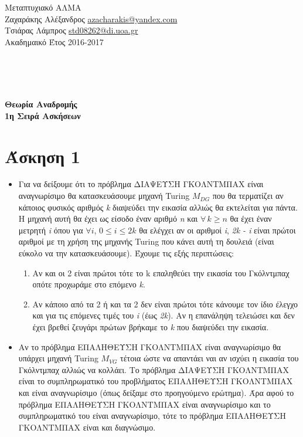\documentclass[11pt]{article}
\begin{document}
\noindent\begin{minipage}{\textwidth}

  \begin{minipage}[b]{.6\textwidth}
    \large{
      Μεταπτυχιακό ΑΛΜΑ\\
      Ζαχαράκης Αλέξανδρος \href{mailto:azacharakis@yandex.com}{azacharakis@yandex.com}\\
      Τσιάρας Λάμπρος \href{mailto:std08262@di.uoa.gr}{std08262@di.uoa.gr} \\
      Ακαδημαικό Έτος 2016-2017
    }
    \\
  \end{minipage}

\end{minipage}
\\ \\ \\
\begin{center}
  \textbf{\Large{Θεωρία Αναδρομής}}\\
  \textbf{\Large{1η Σειρά Ασκήσεων}}
\end{center}                


\section*{Άσκηση 1}
\begin{itemize}
\item Για να δείξουμε ότι το πρόβλημα ΔΙΑΨΕΥΣΗ ΓΚΟΛΝΤΜΠΑΧ είναι αναγνωρίσιμο θα κατασκευάσουμε μηχανή Turing $M_{DG}$ που θα τερματίζει αν κάποιος φυσικός αριθμός \textit{k} διαψεύδει την εικασία αλλιώς θα εκτελείται για πάντα. Η μηχανή αυτή θα έχει ως είσοδο έναν αριθμό \textit{n} και $\forall \, k \geq n$ θα έχει έναν μετρητή \textit{i} όπου για $\forall i$, $0 \leq i \leq 2k$ θα ελέγχει αν οι αριθμοί \textit{i}, \textit{2k - i} είναι πρώτοι αριθμοί με τη χρήση της μηχανής Turing που κάνει αυτή τη δουλειά (είναι εύκολο να την κατασκευάσουμε). Έχουμε τις εξής περιπτώσεις:
	\begin{enumerate}
		\item Αν και οι 2 είναι πρώτοι τότε το k επαληθεύει την εικασία του Γκόλντμπαχ οπότε προχωράμε στο επόμενο \textit{k}. 
		\item Αν κάποιο από τα 2 ή και τα 2 δεν είναι πρώτοι τότε κάνουμε τον ίδιο έλεγχο και για τις επόμενες τιμές του \textit{i} (έως \textit{2k}). Αν η επανάληψη τελειώσει και δεν έχει βρεθεί ζευγάρι πρώτων βρήκαμε το \textit{k} που διαψεύδει την εικασία.
	\end{enumerate}
	
\item Αν το πρόβλημα ΕΠΑΛΗΘΕΥΣΗ ΓΚΟΛΝΤΜΠΑΧ είναι αναγνωρίσιμο θα υπάρχει μηχανή Turing $M_{VG}$ τέτοια ώστε να απαντάει ναι αν ισχύει η εικασία του Γκόλντμπαχ αλλιώς να κολλάει. Το πρόβλημα ΔΙΑΨΕΥΣΗ ΓΚΟΛΝΤΜΠΑΧ είναι το συμπληρωματικό του προβλήματος ΕΠΑΛΗΘΕΥΣΗ ΓΚΟΛΝΤΜΠΑΧ και είναι αναγνωρίσιμο (όπως δείξαμε στο προηγούμενο ερώτημα). Άρα αφού το πρόβλημα ΕΠΑΛΗΘΕΥΣΗ ΓΚΟΛΝΤΜΠΑΧ είναι αναγνωρίσιμο και το συμπληρωματικό του είναι αναγνωρίσιμο, τότε το πρόβλημα ΕΠΑΛΗΘΕΥΣΗ ΓΚΟΛΝΤΜΠΑΧ είναι και διαγνώσιμο. 
\end{itemize}
\end{document}
